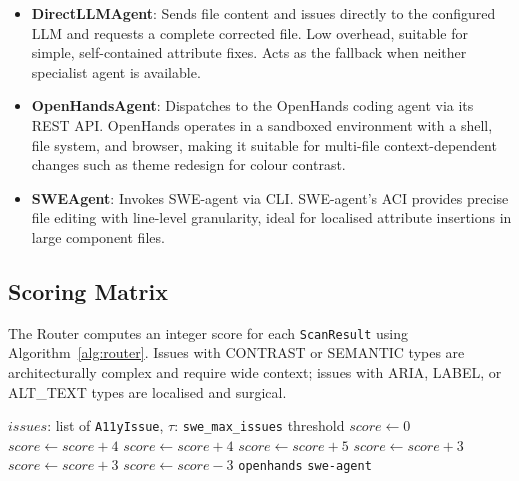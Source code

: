 \documentclass[10pt,conference]{IEEEtran}
\begin{document}
\begin{itemize}
  \item \textbf{DirectLLMAgent}: Sends file content and issues directly to the
    configured LLM and requests a complete corrected file.  Low overhead,
    suitable for simple, self-contained attribute fixes.  Acts as the fallback
    when neither specialist agent is available.
  \item \textbf{OpenHandsAgent}: Dispatches to the OpenHands coding agent
    \cite{openhands2024} via its REST API.  OpenHands operates in a sandboxed
    environment with a shell, file system, and browser, making it suitable for
    multi-file context-dependent changes such as theme redesign for colour
    contrast.
  \item \textbf{SWEAgent}: Invokes SWE-agent \cite{sweagent} via CLI.
    SWE-agent's ACI provides precise file editing with line-level granularity,
    ideal for localised attribute insertions in large component files.
\end{itemize}

\subsection{Scoring Matrix}

The Router computes an integer score for each \texttt{ScanResult} using
Algorithm~\ref{alg:router}.  Issues with CONTRAST or SEMANTIC types are
architecturally complex and require wide context; issues with ARIA, LABEL,
or ALT\_TEXT types are localised and surgical.

\begin{algorithm}[htbp]
\caption{Router Scoring Matrix}
\label{alg:router}
\begin{algorithmic}[1]
\Require $issues$: list of \texttt{A11yIssue}, $\tau$: \texttt{swe\_max\_issues} threshold
\State $score \gets 0$
  \State $score \gets score + 4$ 
\EndIf
{}
  \State $score \gets score + 4$ 
\EndIf
{}
  \State $score \gets score + 5$ 
\EndIf
{}
  \State $score \gets score + 3$ 
\EndIf
{}
  \State $score \gets score + 3$ 
\EndIf
{}
  \State $score \gets score - 3$ 
\EndIf
{}
  \State \Return \texttt{openhands}
\Else
  \State \Return \texttt{swe-agent}
\EndIf
\end{algorithmic}
\end{algorithm}
\end{document}
